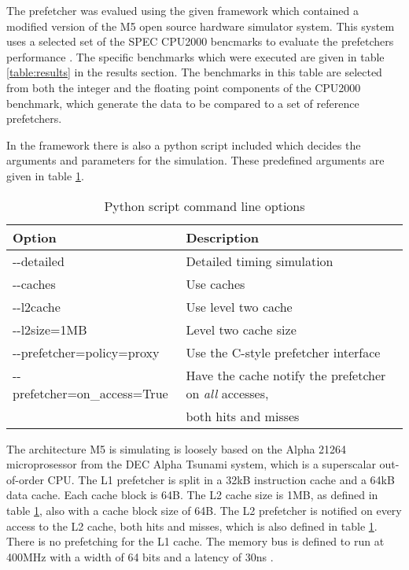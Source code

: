 The prefetcher was evalued using the given framework which contained a modified version of the M5 open source hardware simulator system. This system uses a selected set of the SPEC CPU2000 bencmarks to evaluate the prefetchers performance \cite{reference:spec}. The specific benchmarks which were executed are given in table \ref{table:results} in the results section. The benchmarks in this table are selected from both the integer and the floating point components of the CPU2000 benchmark, which generate the data to be compared to a set of reference prefetchers. 

In the framework there is also a python script included which decides the arguments and parameters for the simulation. These predefined arguments are given in table \ref{table:cmdlineopt}.

\begin{table}[!t]
\renewcommand{\arraystretch}{1.3}
\caption{Python script command line options}
\label{table:cmdlineopt}
\centering
\begin{tabular}{l l}
\bfseries Option & \bfseries Description\\
\hline
-\--detailed & Detailed timing simulation\\
-\--caches & Use caches\\
-\--l2cache & Use level two cache\\
-\--l2size=1MB & Level two cache size\\
-\--prefetcher=policy=proxy & Use the C-style prefetcher interface\\
-\--prefetcher=on\_access=True & Have the cache notify the prefetcher on \emph{all} accesses,\\& both hits and misses\\
\hline
\end{tabular}
\end{table}

The architecture M5 is simulating is loosely based on the Alpha 21264 microprosessor from the DEC Alpha Tsunami system, which is a superscalar out-of-order CPU. The L1 prefetcher is split in a 32kB instruction cache and a 64kB data cache. Each cache block is 64B. The L2 cache size is 1MB, as defined in table \ref{table:cmdlineopt}, also with a cache block size of 64B. The L2 prefetcher is notified on every access to the L2 cache, both hits and misses, which is also defined in table \ref{table:cmdlineopt}. There is no prefetching for the L1 cache. The memory bus is defined to run at 400MHz with a width of 64 bits and a latency of 30ns \cite{reference:opg}. 


